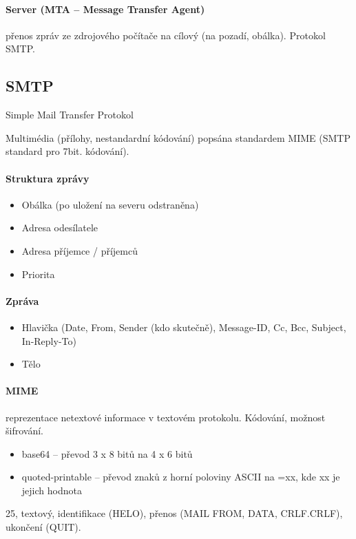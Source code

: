 \documentclass[a4paper, 11pt]{report}
\begin{document}
\paragraph{Server (MTA -- Message Transfer Agent)} přenos zpráv ze zdrojového počítače na cílový (na pozadí, obálka). Protokol SMTP.

\subsection{SMTP} Simple Mail Transfer Protokol

Multimédia (přílohy, nestandardní kódování) popsána standardem MIME (SMTP standard pro 7bit. kódování).

\paragraph{Struktura zprávy}
\begin{itemize}
	\item Obálka (po uložení na severu odstraněna)
	\item Adresa odesílatele
	\item Adresa příjemce / příjemců
	\item Priorita
\end{itemize}

\paragraph{Zpráva}
\begin{itemize}
	\item Hlavička (Date, From, Sender (kdo skutečně), Message-ID, Cc, Bcc, Subject, In-Reply-To)
	\item Tělo
\end{itemize}

\paragraph{MIME} reprezentace netextové informace v textovém protokolu. Kódování, možnost šifrování.
\begin{itemize}
	\item base64 -- převod 3 x 8 bitů na 4 x 6 bitů
	\item quoted-printable -- převod znaků z horní poloviny ASCII na =xx, kde xx je jejich hodnota
\end{itemize}

25, textový, identifikace (HELO), přenos (MAIL FROM, DATA, CRLF.CRLF), ukončení (QUIT).
\end{document}
